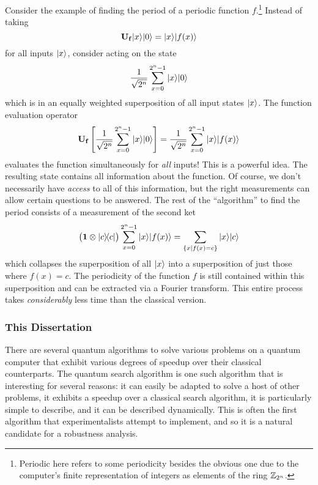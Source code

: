 Consider the example of finding the period of a periodic function 
$f$.\footnote{Periodic here refers to some periodicity besides the
obvious one due to the computer's finite representation of integers
as elements of the ring ${\mathbb{Z}}_{2^n}$.}
Instead of taking 
\begin{equation}
{\bf U_f}{|{x}\rangle}{|{0}\rangle} = {|{x}\rangle}{|{f(x)}\rangle}
\end{equation}
for all inputs ${|{x}\rangle}$, consider acting on the state
\begin{equation}
\frac{1}{\sqrt{2^n}}\sum_{x=0}^{2^n-1}{|{x}\rangle}{|{0}\rangle}
\end{equation}
which is in an equally weighted superposition of all input
states ${|{x}\rangle}$.  The function evaluation operator
\begin{equation}
{\bf U_f} \left\lbrack
\frac{1}{\sqrt{2^n}}\sum_{x=0}^{2^n-1}{|{x}\rangle}{|{0}\rangle}
\right\rbrack
= 
\frac{1}{\sqrt{2^n}}\sum_{x=0}^{2^n-1}{|{x}\rangle}{|{f(x)}\rangle}
\end{equation}
evaluates the function simultaneously for \emph{all} inputs!
This is a powerful idea.  The resulting state contains all
information about the function.  Of course, we don't necessarily
have {\sl access} to all of this information, but the right 
measurements can allow certain questions to be answered.
The rest of the ``algorithm'' to find the period consists
of a measurement of the second ket
\begin{equation}
\bigl(
{\bf 1}\otimes{|{c}\rangle\!\langle{c}|}
\bigr)
\sum_{x=0}^{2^n-1}{|{x}\rangle}{|{f(x)}\rangle}
= \sum_{\lbrace x|f(x)=c\rbrace} {|{x}\rangle}{|{c}\rangle}
\end{equation}
which
collapses the superposition of all ${|{x}\rangle}$ into a 
superposition of just those
where $f(x)=c$.  The periodicity of the function $f$ is still
contained within this superposition and can be extracted via
a Fourier transform.
This entire process takes {\sl considerably} less time than the classical
version.

\subsubsection{This Dissertation} 

There are several quantum algorithms to solve various problems
on a quantum computer that exhibit various degrees of 
speedup over their classical counterparts.  
The quantum search algorithm is one such algorithm that is
interesting for several reasons: it can easily be adapted to
solve a host of other problems, it exhibits a speedup over a
classical search algorithm, it is particularly simple to 
describe, and it can be described dynamically.
This is often the first algorithm that experimentalists attempt
to implement, and so it is a natural candidate for a 
robustness analysis.

